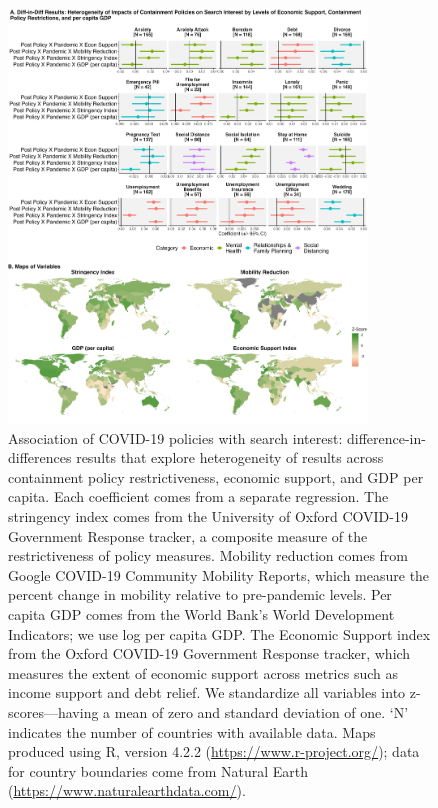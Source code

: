 \documentclass{article}
\begin{document}
\begin{figure}[H]
    \centering
    \includegraphics[width=0.85\textwidth]{figures/did_interact_map_60.png}
    \caption{Association of COVID-19 policies with search interest: difference-in-differences results that explore heterogeneity of results across containment policy restrictiveness, economic support, and GDP per capita. Each coefficient comes from a separate regression. The stringency index comes from the University of Oxford COVID-19 Government Response tracker, a composite measure of the restrictiveness of policy measures. Mobility reduction comes from Google COVID-19 Community Mobility Reports, which measure the percent change in mobility relative to pre-pandemic levels. Per capita GDP comes from the World Bank's World Development Indicators; we use log per capita GDP. The Economic Support index from the Oxford COVID-19 Government Response tracker, which measures the extent of economic support across metrics such as income support and debt relief. We standardize all variables into z-scores---having a mean of zero and standard deviation of one. `N' indicates the number of countries with available data. Maps produced using R, version 4.2.2 (\url{https://www.r-project.org/}); data for country boundaries come from Natural Earth (\url{https://www.naturalearthdata.com/}).}
    \label{fig:did_interact_map_60}
\end{figure}
\end{document}
